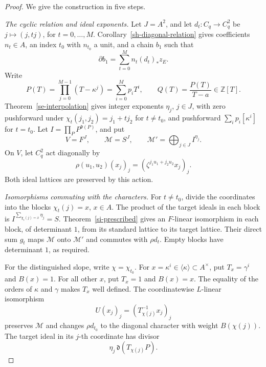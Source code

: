 \begin{proof}
We give the construction in five steps.

\emph{The cyclic relation and ideal exponents.}
Let \(J=A^2\), and let
\(d_t:C_q\to C_q^2\) be \(j\mapsto(j,tj)\),
for \(t=0,\ldots,M\).
Corollary~\ref{sh-diagonal-relation} gives coefficients
\(n_t\in A\), an index \(t_0\) with \(n_{t_0}\)
a unit, and a chain \(b_1\) such that
\[
                 \partial b_1=\sum_{t=0}^M n_t(d_t)_*z_E.
\]
Write
\[
 P(T)=\prod_{j=0}^{M-1}(T-\kappa^j)=\sum_{i=0}^M p_iT^i,
 \qquad Q(T)=\frac{P(T)}{T-a}\in\mathbb Z[T].
\]
Theorem~\ref{se-interpolation} gives integer exponents
\(\eta_j\), \(j\in J\), with zero pushforward under
\(\chi_t(j_1,j_2)=j_1+tj_2\) for \(t\ne t_0\),
and pushforward \(\sum_i p_i[\kappa^i]\) for \(t=t_0\).
Let \(I=\prod_P P^{\mathfrak d(P)}\), and put
\[
        V=F^J,\qquad \mathcal M=S^J,
        \qquad \mathcal M'=\bigoplus_{j\in J}I^{\eta_j}.
\]
On \(V\), let \(C_q^2\) act diagonally by
\[
     \rho(u_1,u_2)(x_j)_j
            =(\zeta^{j_1u_1+j_2u_2}x_j)_j.
\]
Both ideal lattices are preserved by this action.

\emph{Isomorphisms commuting with the characters.}
For \(t\ne t_0\), divide the coordinates into the
blocks \(\chi_t(j)=x\), \(x\in A\).
The product of the target ideals in each block is
\(I^{\sum_{\chi_t(j)=x}\eta_j}=S\).
Theorem~\ref{si-prescribed} gives an \(F\)-linear
isomorphism in each block, of determinant \(1\),
from its standard lattice to its target lattice.
Their direct sum \(g_t\) maps \(\mathcal M\) onto
\(\mathcal M'\) and commutes with \(\rho d_t\).
Empty blocks have determinant \(1\), as required.

For the distinguished slope, write \(\chi=\chi_{t_0}\).
For \(x=\kappa^i\in\langle\kappa\rangle\subset A^\times\),
put \(T_x=\gamma^i\) and \(B(x)=1\).
For all other \(x\), put \(T_x=1\) and \(B(x)=x\).
The equality of the orders of \(\kappa\) and \(\gamma\)
makes \(T_x\) well defined.
The coordinatewise \(L\)-linear isomorphism
\[
             U(x_j)_j=(T_{\chi(j)}^{-1}x_j)_j
\]
preserves \(\mathcal M\) and changes \(\rho d_{t_0}\)
to the diagonal character with weight \(B(\chi(j))\).
The target ideal in its \(j\)-th coordinate has
divisor
\[
             \eta_j\,\mathfrak d(T_{\chi(j)}P).
\]


\end{proof}
